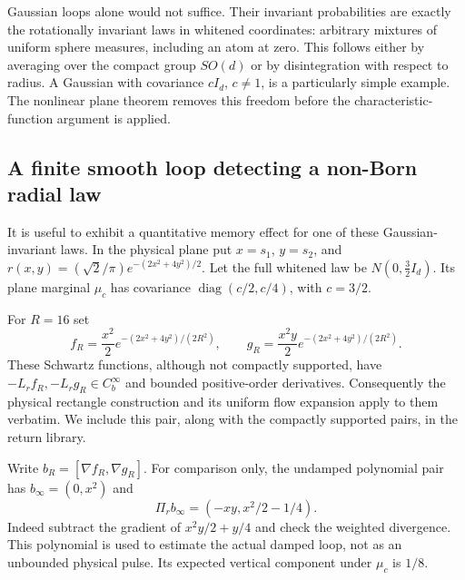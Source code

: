 \documentclass[11pt]{article}
\numberwithin{equation}{section}
\theoremstyle{definition}
\newcommand{\Cb}{C_b^\infty}
\newcommand{\diag}{\operatorname{diag}}
\begin{document}
Gaussian loops alone would not suffice. Their invariant probabilities
are exactly the rotationally invariant laws in whitened coordinates:
arbitrary mixtures of uniform sphere measures, including an atom
at zero. This follows either by averaging over the compact group
$SO(d)$ or by disintegration with respect to radius. A Gaussian
with covariance $cI_d$, $c\ne1$, is a particularly simple example.
The nonlinear plane theorem removes this freedom before the
characteristic-function argument is applied.

\subsection{A finite smooth loop detecting a non-Born radial law}

It is useful to exhibit a quantitative memory effect for one of
these Gaussian-invariant laws. In the physical plane put $x=s_1$,
$y=s_2$, and
$r(x,y)=(\sqrt2/\pi)e^{-(2x^2+4y^2)/2}$.
Let the full whitened law be $N(0,\tfrac32 I_d)$.
Its plane marginal $\mu_c$ has covariance
$\diag(c/2,c/4)$, with $c=3/2$.

For $R=16$ set
\begin{equation}\label{eq:witnessfg}
 f_R=\frac{x^2}{2}e^{-(2x^2+4y^2)/(2R^2)},\qquad
 g_R=\frac{x^2y}{2}e^{-(2x^2+4y^2)/(2R^2)} .
\end{equation}
These Schwartz functions, although not compactly supported, have
$-L_rf_R,-L_rg_R\in\Cb$ and bounded positive-order derivatives.
Consequently the physical rectangle construction and its uniform
flow expansion apply to them verbatim. We include this pair,
along with the compactly supported pairs, in the return library.

Write $b_R=[\nabla f_R,\nabla g_R]$.
For comparison only, the undamped polynomial pair has
$b_\infty=(0,x^2)$ and
\begin{equation}\label{eq:polynomialprojection}
 \Pi_r b_\infty=(-xy,x^2/2-1/4).
\end{equation}
Indeed subtract the gradient of $x^2y/2+y/4$ and check the
weighted divergence. This polynomial is used to estimate the
actual damped loop, not as an unbounded physical pulse.
Its expected vertical component under $\mu_c$ is $1/8$.
\end{document}
